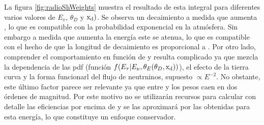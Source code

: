 	La figura \ref{fig:radioShWeights} muestra el resultado de esta integral para diferentes varios valores de $E_v$, $\theta_D$ y ${\rm x_d})$.
	Se observa un decaimiento a medida que aumenta \xd{}, lo que es compatible con la probabilidad exponencial en la atm\'osfera. 
	Sin embargo a medida que aumenta la energ\'ia este se atenua, lo que es compatible con el hecho de que la longitud de decaimiento es proporcional a \etau{}.
	Por otro lado, comprender el comportamiento en funci\'on de \td{} y \ev{} resulta complicado ya que mezcla la dependencia de las pdf (funci\'on $f(E_\tau|E_\nu,\theta_E(\theta_D,{\rm x_d}))$), el efecto de la tierra curva y la forma funcionarl del flujo de neutrninos, supuesto $\propto E^{-2}$.
	No obstante, este \'ultimo factor parece ser relevante ya que entre  y  los pesos caen en dos \'ordenes de magnitud.
	Por este motivo no se utilizar\'an recursos para calcular con detalle las eficiencias por encima de  y se las aproximar\'a por las obtenidas para esta energ\'ia, lo que constituye un enfoque conservador. 
